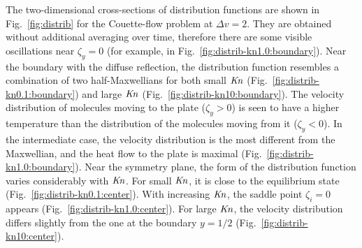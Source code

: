 \documentclass[review]{elsarticle}
\newcommand{\Kn}{\mbox{\textit{Kn}}}
\begin{document}
The two-dimensional cross-sections of distribution functions are shown
in Fig.~\ref{fig:distrib} for the Couette-flow problem at \(\Delta{v}=2\).
They are obtained without additional averaging over time,
therefore there are some visible oscillations near \(\zeta_y=0\)
(for example, in Fig.~\ref{fig:distrib-kn1.0:boundary}).
Near the boundary with the diffuse reflection, the distribution function resembles
a combination of two half-Maxwellians for both small \(\Kn\) (Fig.~\ref{fig:distrib-kn0.1:boundary})
and large \(\Kn\) (Fig.~\ref{fig:distrib-kn10:boundary}).
The velocity distribution of molecules moving to the plate (\(\zeta_y>0\)) is seen to
have a higher temperature than the distribution of the molecules moving from it (\(\zeta_y<0\)).
In the intermediate case, the velocity distribution is the most different from the Maxwellian,
and the heat flow to the plate is maximal (Fig.~\ref{fig:distrib-kn1.0:boundary}).
Near the symmetry plane, the form of the distribution function
varies considerably with \(\Kn\).
For small \(\Kn\), it is close to the equilibrium state (Fig.~\ref{fig:distrib-kn0.1:center}).
With increasing \(\Kn\), the saddle point \(\zeta_i=0\) appears (Fig.~\ref{fig:distrib-kn1.0:center}).
For large \(\Kn\), the velocity distribution differs slightly from the one
at the boundary \(y=1/2\) (Fig.~\ref{fig:distrib-kn10:center}).
\end{document}
